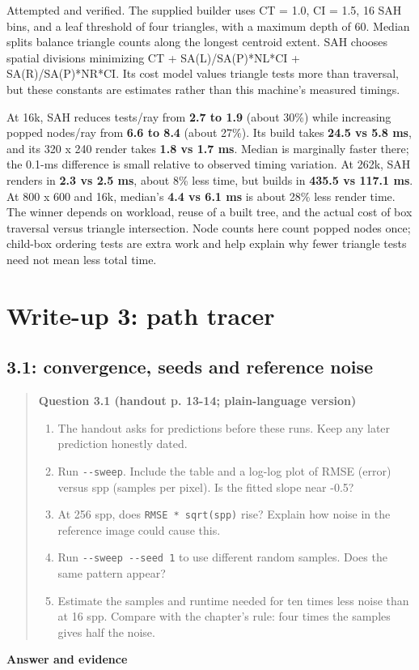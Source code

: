 \documentclass[11pt,a4paper]{article}
\begin{document}
Attempted and verified. The supplied builder uses CT = 1.0, CI = 1.5, 16 SAH bins, and a leaf threshold of four triangles, with a maximum depth of 60. Median splits balance triangle counts along the longest centroid extent. SAH chooses spatial divisions minimizing CT + SA(L)/\allowbreak{}SA(P)*NL*CI + SA(R)/\allowbreak{}SA(P)*NR*CI. Its cost model values triangle tests more than traversal, but these constants are estimates rather than this machine's measured timings.


At 16k, SAH reduces tests/\allowbreak{}ray from \textbf{2.7 to 1.9} (about 30\%) while increasing popped nodes/\allowbreak{}ray from \textbf{6.6 to 8.4} (about 27\%). Its build takes \textbf{24.5 vs 5.8 ms}, and its 320 x 240 render takes \textbf{1.8 vs 1.7 ms}. Median is marginally faster there; the 0.1-ms difference is small relative to observed timing variation. At 262k, SAH renders in \textbf{2.3 vs 2.5 ms}, about 8\% less time, but builds in \textbf{435.5 vs 117.1 ms}. At 800 x 600 and 16k, median's \textbf{4.4 vs 6.1 ms} is about 28\% less render time. The winner depends on workload, reuse of a built tree, and the actual cost of box traversal versus triangle intersection. Node counts here count popped nodes once; child-box ordering tests are extra work and help explain why fewer triangle tests need not mean less total time.


\section{Write-up 3: path tracer}
\subsection*{3.1: convergence, seeds and reference noise}
\begin{quote}\small
\textbf{Question 3.1 (handout p. 13-14; plain-language version)}


\begin{enumerate}
\item The handout asks for predictions before these runs. Keep any later prediction honestly dated.
\item Run \texttt{-{}-sweep}. Include the table and a log-log plot of RMSE (error) versus spp (samples per pixel). Is the fitted slope near -0.5?
\item At 256 spp, does \texttt{RMSE * sqrt(spp)} rise? Explain how noise in the reference image could cause this.
\item Run \texttt{-{}-sweep -{}-seed 1} to use different random samples. Does the same pattern appear?
\item Estimate the samples and runtime needed for ten times less noise than at 16 spp. Compare with the chapter's rule: four times the samples gives half the noise.
\end{enumerate}\end{quote}
\textbf{Answer and evidence}
\end{document}
